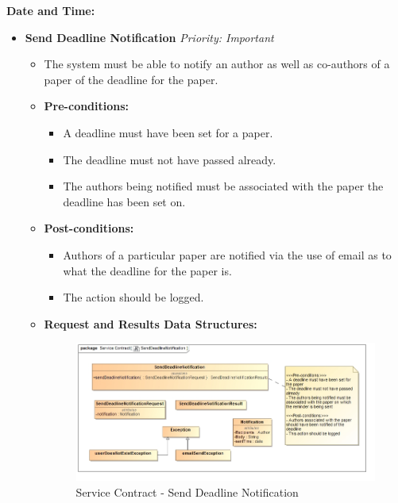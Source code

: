 \documentclass{article}
\begin{document}
				\cleardoublepage
				\textbf{\large{Date and Time:}}
				\begin{itemize}
					\item \textbf{Send Deadline Notification} \hfill \textit{Priority: Important}
					\begin{itemize}
						\item The system must be able to notify an author as well as co-authors of a paper of the deadline for the paper.
						\item \textbf{Pre-conditions:}
						\begin{itemize}
							\item A deadline must have been set for a paper.
							\item The deadline must not have passed already.
							\item The authors being notified must be associated with the paper the deadline has been set on.
						\end{itemize}
						\item \textbf{Post-conditions:}
						\begin{itemize}
							\item Authors of a particular paper are notified via the use of email as to what the deadline for the paper is.
							\item The action should be logged.
						\end{itemize}
						\item \textbf{Request and Results Data Structures:}
						\begin{figure}[H]
							\includegraphics[width=\linewidth]{../Diagrams/ServiceContracts/Notification subsystem/SendDeadlineNotification.jpg}
							\caption{Service Contract - Send Deadline Notification}
						\end{figure}
					\end{itemize}
				\end{itemize}
				
\end{document}
